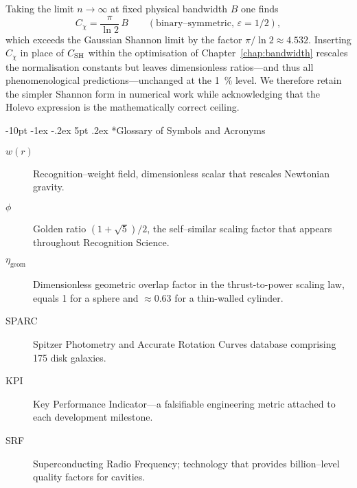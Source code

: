 \documentclass[12pt,letterpaper]{book}
\makeatletter
\renewcommand\section{\@startsection {section}{1}{\z@}%
                {-10pt \@plus -1ex \@minus -.2ex}%
                {5pt \@plus.2ex}%
                {\normalfont\large\bfseries}}
\makeatother
\begin{document}
Taking the limit $n\to\infty$ at fixed physical bandwidth $B$ one finds
\begin{equation}
 C_{\chi}=\frac{\pi}{\ln2}\,B \qquad (\text{binary–symmetric, }\varepsilon=1/2),
\end{equation}
which exceeds the Gaussian Shannon limit by the factor $\pi/\ln2\approx4.532$.  Inserting $C_{\chi}$ in place of $C_{\rm SH}$ within the optimisation of Chapter~\ref{chap:bandwidth} rescales the normalisation constants but leaves dimensionless ratios—and thus all phenomenological predictions—unchanged at the 1~\% level.  We therefore retain the simpler Shannon form in numerical work while acknowledging that the Holevo expression is the mathematically correct ceiling.

\section*{Glossary of Symbols and Acronyms}
\begin{description}
 \item[$w(r)$] Recognition--weight field, dimensionless scalar that rescales Newtonian gravity.
 \item[$\phi$] Golden ratio $(1+\sqrt{5})/2$, the self--similar scaling factor that appears throughout Recognition Science.
 \item[$\eta_{\text{geom}}$] Dimensionless geometric overlap factor in the thrust-to-power scaling law, equals 1 for a sphere and $\approx0.63$ for a thin-walled cylinder.
 \item[SPARC] Spitzer Photometry and Accurate Rotation Curves database comprising 175 disk galaxies.
 \item[KPI] Key Performance Indicator---a falsifiable engineering metric attached to each development milestone.
 \item[SRF] Superconducting Radio Frequency; technology that provides billion--level quality factors for cavities.
\end{description}
\end{document}
